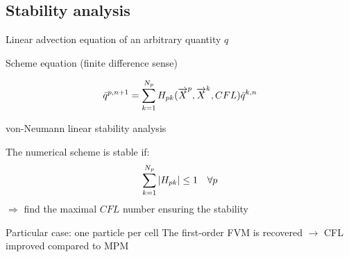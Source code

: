 \subsection{Stability analysis}
\begin{frame}{Linear advection equation of an arbitrary quantity $q$}%
  \begin{block}{Scheme equation (finite difference sense)}
    \begin{footnotesize}
      \begin{equation*}
        \bar{q}^{p,n+1}=\sum_{k=1}^{N_p}H_{pk}({\overrightarrow{X}}^p,{\overrightarrow{X}}^k,CFL)\bar{q}^{k,n}
      \end{equation*}
    \end{footnotesize}
  \end{block}
  \begin{block}{von-Neumann linear stability analysis}
    \begin{footnotesize}
      The numerical scheme is stable if:
      \begin{equation*}
        \sum_{k=1}^{N_p}\left\vert H_{pk}\right\vert \leq 1 \quad \forall p
      \end{equation*}
      \alert{$\Rightarrow$ find the maximal $CFL$ number ensuring the stability}
    \end{footnotesize}
  \end{block}\pause
  \begin{footnotesize}
    \begin{block}{Particular case: one particle per cell}
      The first-order FVM is recovered $\rightarrow$ CFL improved compared to MPM 
    \end{block}
  \end{footnotesize}
\end{frame}

